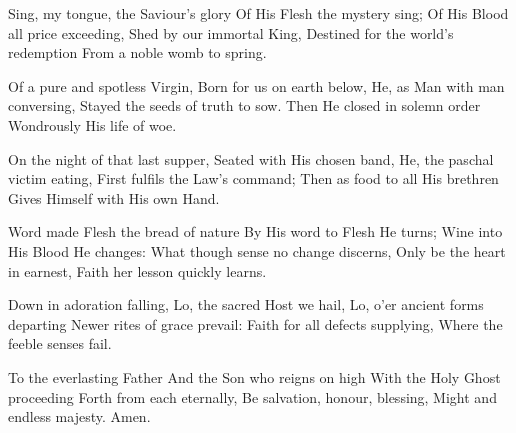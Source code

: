 \documentclass[letterpaper,12pt]{article} %
\begin{document}


\def\greinitialformat#1{%
{\fontsize{34}{34}\selectfont #1}%
}


{

\large%
}
\begin{multicols}{2}
\begin{psalmverses}
{\item Sing, my tongue, the Saviour's glory
Of His Flesh the mystery sing;
Of His Blood all price exceeding,
Shed by our immortal King,
Destined for the world's redemption
From a noble womb to spring.
\item Of a pure and spotless Virgin,
Born for us on earth below,
He, as Man with man conversing,
Stayed the seeds of truth to sow.
Then He closed in solemn order
Wondrously His life of woe.
\item On the night of that last supper,
Seated with His chosen band,
He, the paschal victim eating,
First fulfils the Law's command;
Then as food to all His brethren
Gives Himself with His own Hand.
\item Word made Flesh the bread of nature
By His word to Flesh He turns;
Wine into His Blood He changes:
What though sense no change discerns,
Only be the heart in earnest,
Faith her lesson quickly learns.
\item Down in adoration falling,
Lo, the sacred Host we hail,
Lo, o'er ancient forms departing
Newer rites of grace prevail:
Faith for all defects supplying,
Where the feeble senses fail.
\item To the everlasting Father
And the Son who reigns on high
With the Holy Ghost proceeding
Forth from each eternally,
Be salvation, honour, blessing,
Might and endless majesty.
Amen.}
\end{psalmverses}
\end{multicols}
{}
{ }
{}
\end{document}
